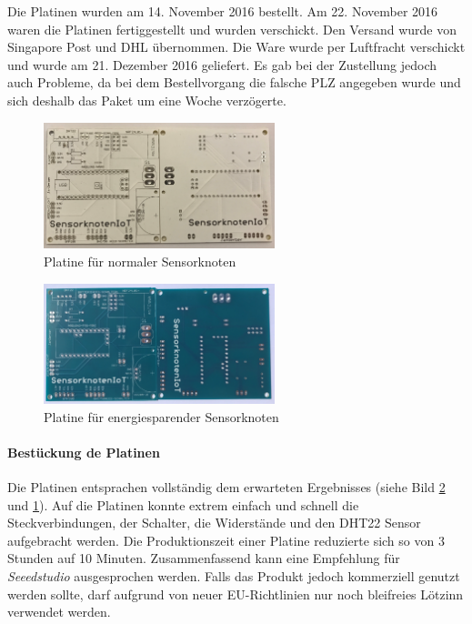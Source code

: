 Die Platinen wurden am 14. November 2016 bestellt. Am 22. November 2016 waren die Platinen fertiggestellt und wurden verschickt. Den Versand wurde von Singapore Post und DHL übernommen. Die Ware wurde per Luftfracht verschickt und wurde am 21. Dezember 2016 geliefert. Es gab bei der Zustellung jedoch auch Probleme, da bei dem Bestellvorgang die falsche PLZ angegeben wurde und sich deshalb das Paket um eine Woche verzögerte.
\begin{figure}
	\centering
	\includegraphics[width=0.6\textwidth]{bilder/platineArduinoNano}
	\caption{Platine für normaler Sensorknoten}
	\label{img:PlatineArduinoNano}
\end{figure}
\begin{figure}
	\centering
	\includegraphics[width=0.6\textwidth]{bilder/platineArduinoProMini}
	\caption{Platine für energiesparender Sensorknoten}
	\label{img:PlatineArduinoProMini}
\end{figure}

\paragraph{Bestückung de Platinen} Die Platinen entsprachen vollständig dem erwarteten Ergebnisses (siehe Bild \ref{img:PlatineArduinoProMini} und \ref{img:PlatineArduinoNano}). Auf die Platinen konnte extrem einfach und schnell die Steckverbindungen, der Schalter, die Widerstände und den DHT22 Sensor aufgebracht werden. Die Produktionszeit einer Platine reduzierte sich so von 3 Stunden auf 10 Minuten. Zusammenfassend kann eine Empfehlung für \textit{Seeedstudio} ausgesprochen werden. Falls das Produkt jedoch kommerziell genutzt werden sollte, darf aufgrund von neuer EU-Richtlinien nur noch bleifreies Lötzinn verwendet werden. 
